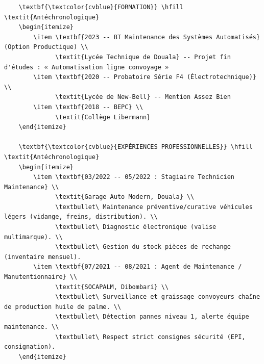 \documentclass[11pt]{article}
\begin{document}
\begin{exoresolu}
\begin{verbatim}
    \textbf{\textcolor{cvblue}{FORMATION}} \hfill \textit{Antéchronologique}
    \begin{itemize}
        \item \textbf{2023 -- BT Maintenance des Systèmes Automatisés} (Option Productique) \\
              \textit{Lycée Technique de Douala} -- Projet fin d'études : « Automatisation ligne convoyage »
        \item \textbf{2020 -- Probatoire Série F4 (Électrotechnique)} \\
              \textit{Lycée de New-Bell} -- Mention Assez Bien
        \item \textbf{2018 -- BEPC} \\
              \textit{Collège Libermann}
    \end{itemize}

    \textbf{\textcolor{cvblue}{EXPÉRIENCES PROFESSIONNELLES}} \hfill \textit{Antéchronologique}
    \begin{itemize}
        \item \textbf{03/2022 -- 05/2022 : Stagiaire Technicien Maintenance} \\
              \textit{Garage Auto Modern, Douala} \\
              \textbullet\ Maintenance préventive/curative véhicules légers (vidange, freins, distribution). \\
              \textbullet\ Diagnostic électronique (valise multimarque). \\
              \textbullet\ Gestion du stock pièces de rechange (inventaire mensuel).
        \item \textbf{07/2021 -- 08/2021 : Agent de Maintenance / Manutentionnaire} \\
              \textit{SOCAPALM, Dibombari} \\
              \textbullet\ Surveillance et graissage convoyeurs chaîne de production huile de palme. \\
              \textbullet\ Détection pannes niveau 1, alerte équipe maintenance. \\
              \textbullet\ Respect strict consignes sécurité (EPI, consignation).
    \end{itemize}
    \end{verbatim}


\end{exoresolu}
\end{document}
